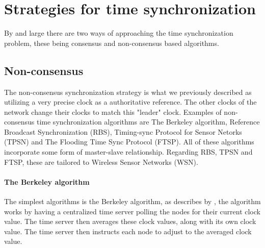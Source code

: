 \documentclass[a4paper,12pt]{article}
\begin{document}
\clearpage

\section{Strategies for time synchronization}


By and large there are two ways of approaching the time synchronization problem, these being consensus and non-consensus based algorithms.

    \subsection{Non-consensus}
    The non-consensus synchronization strategy is what we previously described as utilizing a very precise clock as a authoritative reference. The other clocks of the network change their clocks to match this "leader" clock.
    Examples of non-consensus time synchronization algorithms are The Berkeley algorithm, Reference Broadcast Synchronization (RBS), Timing-sync Protocol for Sensor Netorks (TPSN) and The Flooding Time Sync Protocol (FTSP). All of these algorithms incorporate some form of master-slave relationship. Regarding RBS, TPSN and FTSP, these are tailored to Wireless Sensor Networks (WSN).
    
    \paragraph{The Berkeley algorithm} The simplest algorithms is the Berkeley algorithm, as describes by \citet{Gusella89}, the algorithm works by having a centralized time server polling the nodes for their current clock value. The time server then averages these clock values, along with its own clock value. The time server then instructs each node to adjust to the averaged clock value. 
\end{document}
